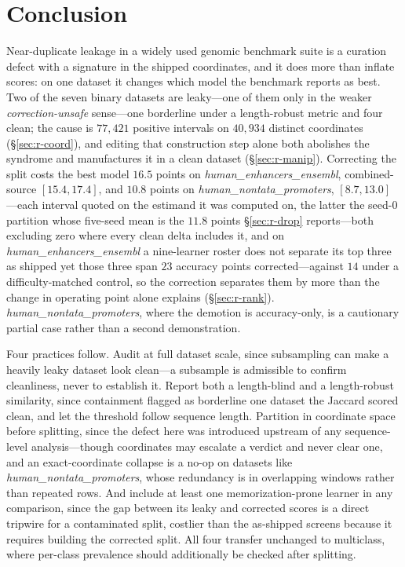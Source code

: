 \documentclass[webpdf,modern,large,namedate]{oup-authoring-template}%
\begin{document}
\section{Conclusion}\label{sec:conclusion}

Near-duplicate leakage in a widely used genomic benchmark suite is a curation defect with a signature in the shipped coordinates, and it does more than inflate scores: on one dataset it changes which model the benchmark reports as best. Two of the seven binary datasets are leaky---one of them only in the weaker \emph{correction-unsafe} sense---one borderline under a length-robust metric and four clean; the cause is $77{,}421$ positive intervals on $40{,}934$ distinct coordinates (\S\ref{sec:r-coord}), and editing that construction step alone both abolishes the syndrome and manufactures it in a clean dataset (\S\ref{sec:r-manip}). Correcting the split costs the best model $16.5$ points on \textit{human\_enhancers\_ensembl}, combined-source $[15.4,17.4]$, and $10.8$ points on \textit{human\_nontata\_promoters}, $[8.7,13.0]$---each interval quoted on the estimand it was computed on, the latter the seed-$0$ partition whose five-seed mean is the $11.8$ points \S\ref{sec:r-drop} reports---both excluding zero where every clean delta includes it, and on \textit{human\_enhancers\_ensembl} a nine-learner roster does not separate its top three as shipped yet those three span $23$ accuracy points corrected---against $14$ under a difficulty-matched control, so the correction separates them by more than the change in operating point alone explains (\S\ref{sec:r-rank}). \textit{human\_nontata\_promoters}, where the demotion is accuracy-only, is a cautionary partial case rather than a second demonstration.

Four practices follow.\label{sec:practices} Audit at full dataset scale, since subsampling can make a heavily leaky dataset look clean---a subsample is admissible to confirm cleanliness, never to establish it. Report both a length-blind and a length-robust similarity, since containment flagged as borderline one dataset the Jaccard scored clean, and let the threshold follow sequence length. Partition in coordinate space before splitting, since the defect here was introduced upstream of any sequence-level analysis---though coordinates may escalate a verdict and never clear one, and an exact-coordinate collapse is a no-op on datasets like \textit{human\_nontata\_promoters}, whose redundancy is in overlapping windows rather than repeated rows. And include at least one memorization-prone learner in any comparison, since the gap between its leaky and corrected scores is a direct tripwire for a contaminated split, costlier than the as-shipped screens because it requires building the corrected split. All four transfer unchanged to multiclass, where per-class prevalence should additionally be checked after splitting.
\end{document}

